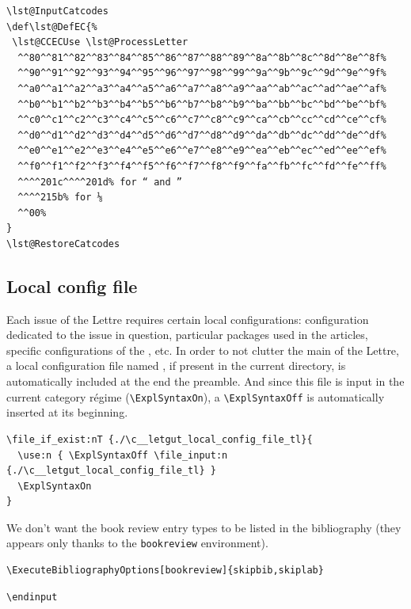\documentclass{letgut}
\begin{document}
\begin{lstlisting}
\lst@InputCatcodes
\def\lst@DefEC{%
 \lst@CCECUse \lst@ProcessLetter
  ^^80^^81^^82^^83^^84^^85^^86^^87^^88^^89^^8a^^8b^^8c^^8d^^8e^^8f%
  ^^90^^91^^92^^93^^94^^95^^96^^97^^98^^99^^9a^^9b^^9c^^9d^^9e^^9f%
  ^^a0^^a1^^a2^^a3^^a4^^a5^^a6^^a7^^a8^^a9^^aa^^ab^^ac^^ad^^ae^^af%
  ^^b0^^b1^^b2^^b3^^b4^^b5^^b6^^b7^^b8^^b9^^ba^^bb^^bc^^bd^^be^^bf%
  ^^c0^^c1^^c2^^c3^^c4^^c5^^c6^^c7^^c8^^c9^^ca^^cb^^cc^^cd^^ce^^cf%
  ^^d0^^d1^^d2^^d3^^d4^^d5^^d6^^d7^^d8^^d9^^da^^db^^dc^^dd^^de^^df%
  ^^e0^^e1^^e2^^e3^^e4^^e5^^e6^^e7^^e8^^e9^^ea^^eb^^ec^^ed^^ee^^ef%
  ^^f0^^f1^^f2^^f3^^f4^^f5^^f6^^f7^^f8^^f9^^fa^^fb^^fc^^fd^^fe^^ff%
  ^^^^201c^^^^201d% for “ and ”
  ^^^^215b% for ⅛
  ^^00%
}
\lst@RestoreCatcodes
\end{lstlisting}

\subsection{Local config file}
\label{sec:orgcc0dfe6}

Each issue of the Lettre requires certain local configurations: configuration
dedicated to the issue in question, particular packages used in the articles,
specific configurations of the , etc. In order to not clutter
the main  of the Lettre, a local configuration file named
, if present in the current directory, is automatically
included at the end the preamble. And since this file is input in the current
category régime (\lstinline+\ExplSyntaxOn+), a \lstinline+\ExplSyntaxOff+ is automatically inserted
at its beginning.

\begin{lstlisting}
\file_if_exist:nT {./\c__letgut_local_config_file_tl}{
  \use:n { \ExplSyntaxOff \file_input:n {./\c__letgut_local_config_file_tl} }
  \ExplSyntaxOn
}
\end{lstlisting}

We don't want the book review entry types to be listed in the bibliography
(they appears only thanks to the \lstinline+bookreview+ environment).

\begin{lstlisting}
\ExecuteBibliographyOptions[bookreview]{skipbib,skiplab}
\end{lstlisting}

\begin{lstlisting}
\endinput
\end{lstlisting}
\end{document}
